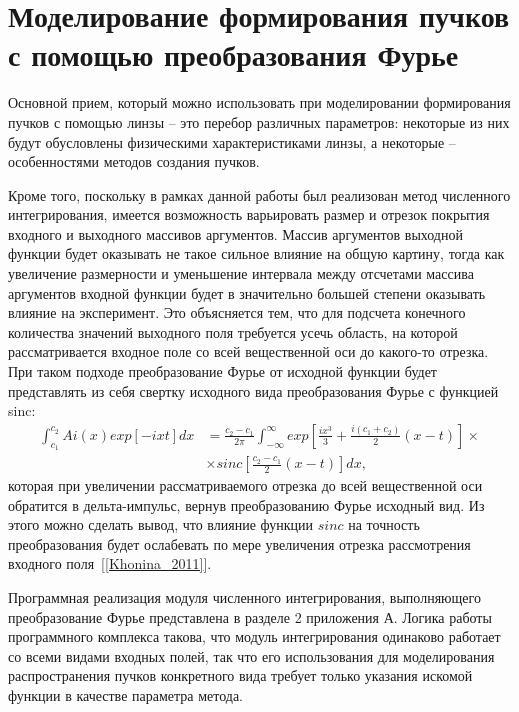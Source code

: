     \section{\nohyphens{Моделирование формирования пучков с помощью преобразования Фурье}}{
    Основной прием, который можно использовать при моделировании
    формирования пучков с помощью линзы – это перебор различных параметров:
    некоторые из них будут обусловлены физическими характеристиками линзы, а
    некоторые – особенностями методов создания пучков.

    Кроме того, поскольку в рамках данной работы был реализован метод
    численного интегрирования, имеется возможность варьировать размер и отрезок покрытия
    входного и выходного массивов аргументов. Массив аргументов выходной
    функции будет оказывать не такое сильное влияние на общую картину, тогда
    как увеличение размерности и уменьшение интервала между отсчетами массива
    аргументов входной функции будет в значительно большей степени оказывать
    влияние на эксперимент. Это объясняется тем, что для подсчета конечного
    количества значений выходного поля требуется усечь область, на которой
    рассматривается входное поле со всей вещественной оси до какого-то отрезка.
    При таком подходе преобразование Фурье от исходной функции будет
    представлять из себя свертку исходного вида преобразования Фурье с
    функцией sinc:
    \begin{align*}
        \int^{c_2}_{c_1} Ai(x)exp[-ixt]dx &= \frac{c_2-c_1}{2\pi}\int^{\infty}_{-\infty}exp[\frac{ix^3}{3} + \frac{i(c_1+c_2)}{2}(x-t)] \times\\
        & \times sinc[\frac{c_2-c_1}{2}(x-t)]dx,
    \end{align*}
    которая при увеличении рассматриваемого отрезка до всей
    вещественной оси обратится в дельта-импульс, вернув преобразованию Фурье
    исходный вид. Из этого можно сделать вывод, что влияние функции $sinc$ на
    точность преобразования будет ослабевать по мере увеличения отрезка
    рассмотрения входного поля~[\ref{Khonina_2011}].

    Программная реализация модуля численного интегрирования,
    выполняющего преобразование Фурье представлена в разделе 2 приложения А. Логика
    работы программного комплекса такова, что модуль интегрирования одинаково
    работает со всеми видами входных полей, так что его использования для
    моделирования распространения пучков конкретного вида требует только
    указания искомой функции в качестве параметра метода.

}
